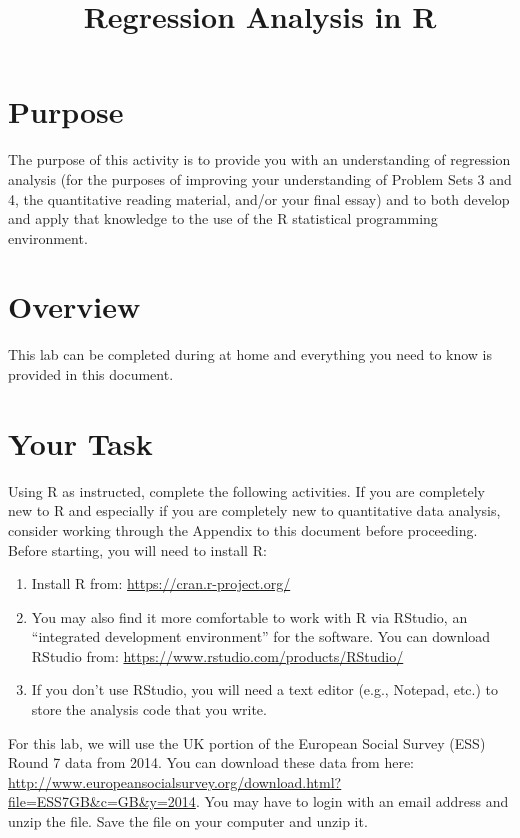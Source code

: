 \documentclass[a4paper,12pt]{article}
\title{Regression Analysis in R}
\author{}
\date{}
\begin{document}
\vspace{-4em}

\maketitle

\vspace{-4em}

\section{Purpose}

The purpose of this activity is to provide you with an understanding of regression analysis (for the purposes of improving your understanding of Problem Sets 3 and 4, the quantitative reading material, and/or your final essay) and to both develop and apply that knowledge to the use of the R statistical programming environment.

\section{Overview}

This lab can be completed during at home and everything you need to know is provided in this document.

\section{Your Task}

Using R as instructed, complete the following activities. If you are completely new to R and especially if you are completely new to quantitative data analysis, consider working through the Appendix to this document before proceeding. Before starting, you will need to install R:

\begin{enumerate}
\item Install R from: \url{https://cran.r-project.org/}
\item You may also find it more comfortable to work with R via RStudio, an ``integrated development environment'' for the software. You can download RStudio from: \url{https://www.rstudio.com/products/RStudio/}
\item If you don't use RStudio, you will need a text editor (e.g., Notepad, etc.) to store the analysis code that you write.
\end{enumerate}

\noindent For this lab, we will use the UK portion of the European Social Survey (ESS) Round 7 data from 2014. You can download these data from here: \url{http://www.europeansocialsurvey.org/download.html?file=ESS7GB&c=GB&y=2014}. You may have to login with an email address and unzip the file. Save the file on your computer and unzip it.
\end{document}
